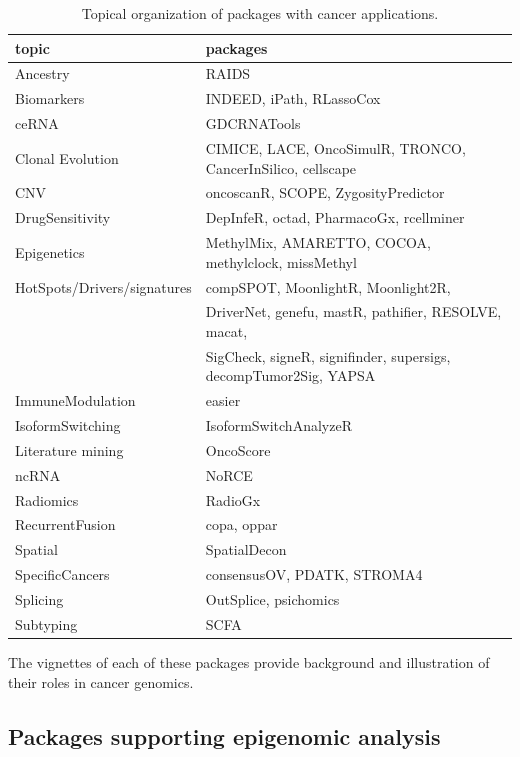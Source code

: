 \documentclass[graybox]{svmult}
\begin{document}
\begin{table}
\caption{\label{tab:tab-wflow}Topical organization of packages with cancer applications.}
\begin{tabular}{l{4cm}p{6cm}}
\toprule
topic & packages\\
\midrule
Ancestry & RAIDS\\
Biomarkers & INDEED, iPath, RLassoCox\\
ceRNA & GDCRNATools\\
Clonal Evolution & CIMICE, LACE, OncoSimulR, TRONCO, CancerInSilico, cellscape\\
CNV & oncoscanR, SCOPE, ZygosityPredictor\\
\addlinespace
DrugSensitivity & DepInfeR, octad, PharmacoGx, rcellminer\\
Epigenetics & MethylMix, AMARETTO, COCOA, methylclock, missMethyl\\
HotSpots/Drivers/signatures & compSPOT, MoonlightR, Moonlight2R, \\
 & DriverNet, genefu, mastR, pathifier, RESOLVE, macat, \\
 & SigCheck, signeR, signifinder, supersigs, decompTumor2Sig, YAPSA\\
ImmuneModulation & easier\\
IsoformSwitching & IsoformSwitchAnalyzeR\\
\addlinespace
Literature mining & OncoScore\\
ncRNA & NoRCE\\
Radiomics & RadioGx\\
RecurrentFusion & copa, oppar\\
Spatial & SpatialDecon\\
\addlinespace
SpecificCancers & consensusOV, PDATK, STROMA4\\
Splicing & OutSplice, psichomics\\
Subtyping & SCFA\\
\end{tabular}
\bottomrule
\end{table}

The vignettes of each of these packages provide background and
illustration of their roles in cancer genomics.

\subsection{Packages supporting epigenomic analysis}\label{packages-supporting-epigenomic-analysis}
\end{document}
